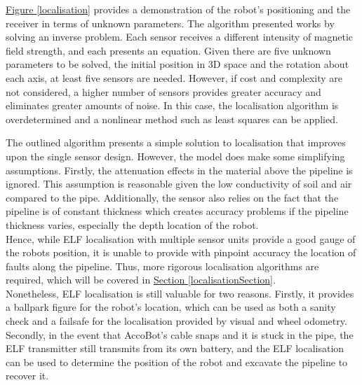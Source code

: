 \documentclass[11pt]{article}		%
\newcommand{\figref}[1]{\hyperref[#1]{Figure \ref*{#1}}}    %
\newcommand{\sectref}[1]{\hyperref[#1]{Section \ref*{#1}}}     %
\begin{document}
			\hspace*{3ex} \figref{localisation} provides a demonstration of the robot's positioning and the receiver in terms of unknown parameters. The algorithm presented works by solving an inverse problem. Each sensor receives a different intensity of magnetic field strength, and each presents an equation. Given there are five unknown parameters to be solved, the initial position in 3D space and the rotation about each axis, at least five sensors are needed. However, if cost and complexity are not considered, a higher number of sensors provides greater accuracy and eliminates greater amounts of noise. In this case, the localisation algorithm is overdetermined and a nonlinear method such as least squares can be applied.
		    
		    \begin{floatingfigure}[r]{0pt} \end{floatingfigure}
		    
            \hspace*{3ex}The outlined algorithm presents a simple solution to localisation that improves upon the single sensor design. However, the model does make some simplifying assumptions. Firstly, the attenuation effects in the material above the pipeline is ignored. This assumption is reasonable given the low conductivity of soil and air compared to the pipe. Additionally, the sensor also relies on the fact that the pipeline is of constant thickness which creates accuracy problems if the pipeline thickness varies, especially the depth location of the robot. 
			\\
			\hspace*{3ex}Hence, while ELF localisation with multiple sensor units provide a good gauge of the robots position, it is unable to provide with pinpoint accuracy the location of faults along the pipeline. Thus, more rigorous localisation algorithms are required, which will be covered in \sectref{localisationSection}.
			\\
			\hspace*{3ex}Nonetheless, ELF localisation is still valuable for two reasons. Firstly, it provides a ballpark figure for the robot's location, which can be used as both a sanity check and a failsafe for the localisation provided by visual and wheel odometry.  Secondly, in the event that AccoBot's cable snaps and it is stuck in the pipe, the ELF transmitter still transmits from its own battery, and the ELF localisation can be used to determine the position of the robot and excavate the pipeline to recover it. 
			
\end{document}
